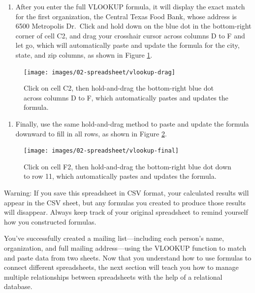 \documentclass[
  english,
]{book}
\providecommand{\tightlist}{%
  \setlength{\itemsep}{0pt}\setlength{\parskip}{0pt}}
\begin{document}
\begin{enumerate}
\def\labelenumi{\arabic{enumi}.}
\setcounter{enumi}{4}
\tightlist
\item
  After you enter the full VLOOKUP formula, it will display the exact match for the first organization, the Central Texas Food Bank, whose address is 6500 Metropolis Dr.~Click and hold down on the blue dot in the bottom-right corner of cell C2, and drag your crosshair cursor across columns D to F and let go, which will automatically paste and update the formula for the city, state, and zip columns, as shown in Figure \ref{fig:vlookup-drag}.
\end{enumerate}



\begin{figure}
\texttt{[image: images/02-spreadsheet/vlookup-drag]} \caption{Click on cell C2, then hold-and-drag the bottom-right blue dot across columns D to F, which automatically pastes and updates the formula.}\label{fig:vlookup-drag}
\end{figure}

\begin{enumerate}
\def\labelenumi{\arabic{enumi}.}
\setcounter{enumi}{5}
\tightlist
\item
  Finally, use the same hold-and-drag method to paste and update the formula downward to fill in all rows, as shown in Figure \ref{fig:vlookup-final}.
\end{enumerate}



\begin{figure}
\texttt{[image: images/02-spreadsheet/vlookup-final]} \caption{Click on cell F2, then hold-and-drag the bottom-right blue dot down to row 11, which automatically pastes and updates the formula.}\label{fig:vlookup-final}
\end{figure}

Warning: If you save this spreadsheet in CSV format, your calculated results will appear in the CSV sheet, but any formulas you created to produce those results will disappear. Always keep track of your original spreadsheet to remind yourself how you constructed formulas.

You've successfully created a mailing list---including each person's name, organization, and full mailing address---using the VLOOKUP function to match and paste data from two sheets. Now that you understand how to use formulas to connect different spreadsheets, the next section will teach you how to manage multiple relationships between spreadsheets with the help of a relational database.
\end{document}
